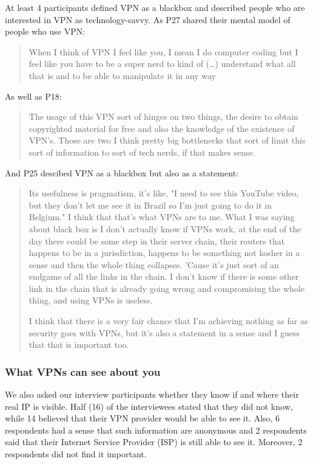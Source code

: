 At least 4 participants defined VPN as a blackbox and described people who are
interested in VPN as technology-savvy. As P27 shared their mental model of
people who use VPN: \begin{quote}When I think of VPN I feel like you, I mean I
do computer coding but I feel like you have to be a super nerd to kind of
(\dots) understand what all that is and to be able to manipulate it in any
way\end{quote}


As well as P18: \begin{quote}The usage of this VPN sort of hinges on two
things, the desire to obtain copyrighted material for free and also the
knowledge of the existence of VPN's. Those are two I think pretty big
bottlenecks that sort of limit this sort of information to sort of tech nerds,
if that makes sense.\end{quote}


And P25 descibed VPN as a blackbox but also as a statement:
\begin{quote} Its usefulness is pragmatism, it's like, "I need to see this YouTube video, but they don't let me see it in Brazil so I'm just going to do it
    in Belgium." I think that that's what VPNs are to me. What I was saying
    about black box is I don't actually know if VPNs work, at the end of the
    day there could be some step in their server chain, their routers that
    happens to be in a jurisdiction, happens to be something not kosher in a
    sense and then the whole thing collapses. 'Cause it's just sort of an
    endgame of all the links in the chain. I don't know if there is some other
    link in the chain that is already going wrong and compromising the whole
    thing, and using VPNs is useless.


I think that there is a very fair chance that I'm achieving nothing as far as
security goes with VPNs, but it's also a statement in a sense and I guess that
that is important too.\end{quote}

\subsubsection{What VPNs can see about you}
We also asked our interview participants whether they know if and where their
real IP is visible. Half (16) of the interviewees stated that they did not
know, while 14 believed that their VPN provider would be able to see it. Also,
6 respondents had a sense that such information are anonymous and 2
respondents said that their Internet Service Provider (ISP) is still able to
see it. Moreover, 2 respondents did not find it important.

